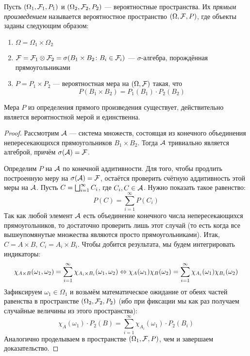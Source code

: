 \begin{definition}
	Пусть $(\Omega_1, \mathcal{F}_1, P_1)$ и $(\Omega_2, \mathcal{F}_2, P_2)$ --- вероятностные пространства. Их \textit{прямым произведением} называется вероятностное пространство $(\Omega, \mathcal{F}, P)$, где объекты заданы следующим образом:
	\begin{enumerate}
		\item $\Omega = \Omega_1 \times \Omega_2$
		
		\item $\mathcal{F} = \mathcal{F}_1 \otimes \mathcal{F}_2 = \sigma(B_1 \times B_2 \colon B_i \in \mathcal{F}_i)$ --- $\sigma$-алгебра, порождённая прямоугольниками
		
		\item $P = P_1 \times P_2$ --- вероятностная мера на $(\Omega, \mathcal{F})$ такая, что
		\[
			P(B_1 \times B_2) = P_1(B_1) \cdot P_2(B_2)
		\]
	\end{enumerate}
\end{definition}

\begin{lemma}
	Мера $P$ из определения прямого произведения существует, действительно является вероятностной мерой и единственна.
\end{lemma}

\begin{proof}
	Рассмотрим $\mathcal{A}$ --- система множеств, состоящая из конечного объединения непересекающихся прямоугольников $B_1 \times B_2$. Тогда $\mathcal{A}$ тривиально является алгеброй, причём $\sigma(\mathcal{A}) = \mathcal{F}$.
	
	Определим $P$ на $\mathcal{A}$ по конечной аддитивности. Для того, чтобы продлить построенную меру на $\sigma(\mathcal{A}) = \mathcal{F}$, остаётся проверить счётную аддитивность этой меры на $\mathcal{A}$. Пусть $C = \bigsqcup_{i = 1}^\infty C_i$, где $C_i, C \in \mathcal{A}$. Нужно показать такое равенство:
	\[
		P(C) = \sum_{i = 1}^\infty P(C_i)
	\]
	Так как любой элемент $\mathcal{A}$ есть объединение конечного числа непересекающихся прямоугольников, то достаточно проверить лишь этот случай (то есть когда все вышеупомянутые множества являются просто прямоугольниками). Итак, $C = A \times B$, $C_i = A_i \times B_i$. Чтобы добится результата, мы будем интегрировать индикаторы:
	\[
		\chi_{A \times B}(\omega_1, \omega_2) = \sum_{i = 1}^\infty \chi_{A_i \times B_i}(\omega_1, \omega_2) \Leftrightarrow \chi_A(\omega_1)\chi_B(\omega_2) = \sum_{i = 1}^\infty \chi_{A_i}(\omega_1)\chi_{B_i}(\omega_2)
	\]
	Зафиксируем $\omega_1 \in \Omega_1$ и возьмём математическое ожидание от обеих частей равенства в пространстве $(\Omega_2, \mathcal{F}_2, P_2)$ (ибо при фиксации мы как раз получаем случайные величины из этого пространства):
	\[
		\chi_A(\omega_1) \cdot P_2(B) = \sum_{i = 1}^\infty \chi_{A_i}(\omega_1) \cdot P_2(B_i)
	\]
	Аналогично проделываем в пространстве $(\Omega_1, \mathcal{F}, P)$, чем и завершаем доказательство.
\end{proof}

